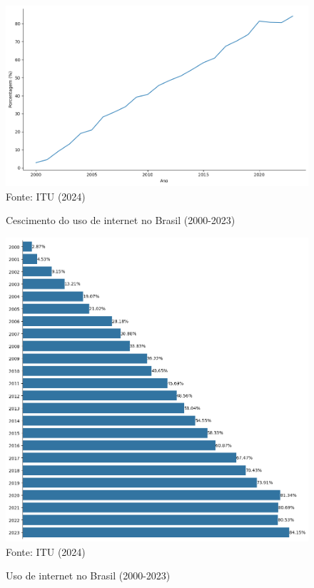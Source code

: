 \begin{figure}[ht]
    \centering
    \caption{Cescimento do uso de internet no Brasil (2000-2023)}
    \includegraphics[width=1\linewidth]{figuras/internet/lineplot_uso_internet_brasil_itu.png}
    \label{fig:crescimento_internet_brasil_itu}
    \footnotesize{Fonte: ITU (2024)}
\end{figure}

\begin{figure}[ht]
    \centering
    \caption{Uso de internet no Brasil (2000-2023)}
    \includegraphics[width=1\linewidth]{figuras/internet/barplot_uso_internet_brasil_itu.png}
    \label{fig:uso_internet_brasil_itu}
    \footnotesize{Fonte: ITU (2024)}
\end{figure}

